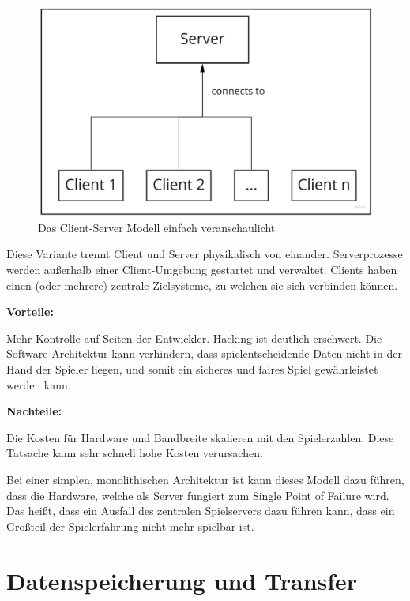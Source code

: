 \begin{figure}
\centering
\includegraphics{images/Client_Server.jpg}
\caption[Client-Server Modell]{Das Client-Server Modell einfach veranschaulicht}
\label{pic:Client_Server}
\end{figure}



Diese Variante trennt Client und Server physikalisch von einander. Serverprozesse werden außerhalb einer Client-Umgebung gestartet und verwaltet. Clients haben einen (oder mehrere) zentrale Zielsysteme, zu welchen sie sich verbinden können.

\textbf{Vorteile:}

Mehr Kontrolle auf Seiten der Entwickler. Hacking ist deutlich erschwert. Die Software-Architektur kann verhindern, dass spielentscheidende Daten nicht in der Hand der Spieler liegen, und somit ein sicheres und faires Spiel gewährleistet werden kann.
\cite{Smed.2002}

\textbf{Nachteile:}

Die Kosten für Hardware und Bandbreite skalieren mit den Spielerzahlen. Diese Tatsache kann sehr schnell hohe Kosten verursachen. \cite{Deng.2018}

Bei einer simplen, monolithischen Architektur ist kann dieses Modell dazu führen, dass die Hardware, welche als Server fungiert zum Single Point of Failure wird. Das heißt, dass ein Ausfall des zentralen Spielservers dazu führen kann, dass ein Großteil der Spielerfahrung nicht mehr spielbar ist.

\section{Datenspeicherung und Transfer}

